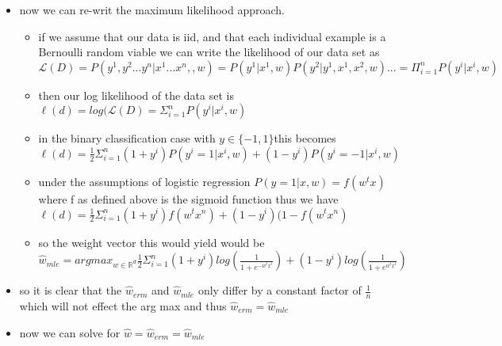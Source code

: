 \documentclass{article}
\theoremstyle{plain}
\theoremstyle{definition}
\begin{document}
\begin{enumerate}
\begin{itemize}
\begin{itemize}
    \item notice further that if we define the sigmoid function as $f(x)=\frac{1}{1+e^{-x}}$
    we can express our problem as $\hat{w}_{erm}= argmax_{w\in \mathbb{R}^{d}}\frac{1}{2n}\Sigma_{i=1}^{n}(1+y^i)log(\frac{1}{1+e^{-w^tx^i}})+(1-y^i)log(\frac{1}{1+e^{w^tx^i}}) = argmax_{w\in \mathbb{R}^{d}}\frac{1}{2n}\Sigma_{i=1}^{n}(1+y^i)f(w^tx^i)+(1-y^i)f(-w^tx^i)$
    \item further note the following equality $1-f(x)=1-\frac{1}{1+e^{-x}}=\frac{e^{-x}}{1+e^{-x}}=\frac{1}{1+e^x}=f(-x)$
    \item so substituting this back into our erm function yields our final result for erm $$\hat{w}_{erm}=argmax_{w\in \mathbb{R}^{d}}\frac{1}{2n}\Sigma_{i=1}^{n}(1+y^i)log(f(x))+(1-y^i)log(1-f(x))$$
\end{itemize}
\item now we can re-writ the maximum likelihood approach. 
\begin{itemize}
    \item if we assume that our data is iid, and that each individual example is a Bernoulli random viable we can write the likelihood of our data set as $\mathcal{L}(D)=P(y^1,y^2...y^n|x^1...x^n,,w)=P(y^1|x^1,w)P(y^2|y^1,x^1,x^2,w)...=\Pi_{i=1}^{n}P(y^i|x^i, w)$ 
    \item then our log likelihood of the data set is $\ell(d)=log(\mathcal{L}(D)=\Sigma_{i=1}^{n}P(y^i|x^i,w)$
    \item in the binary classification case with $y\in\{-1,1\}$this becomes $\ell(d)=\frac{1}{2}\Sigma_{i=1}^{n}(1+y^i)P(y^i=1|x^i,w)+(1-y^i)P(y^i=-1|x^i,w)$
    \item under the assumptions of logistic regression $P(y=1|x,w)=f(w^tx)$ where f as defined above is the sigmoid function thus we have $\ell(d)=\frac{1}{2}\Sigma_{i=1}^{n}(1+y^i)f(w^tx^n)+(1-y^i)(1-f(w^tx^n)$
    \item so the weight vector this would yield would be    $\hat{w}_{mle}= argmax_{w\in \mathbb{R}^{d}}\frac{1}{2}\Sigma_{i=1}^{n}(1+y^i)log(\frac{1}{1+e^{-w^tx^i}})+(1-y^i)log(\frac{1}{1+e^{w^tx^i}}) $
\end{itemize}
\item so it is clear that the $\hat{w}_{erm}$ and $\hat{w}_{mle}$ only differ by a constant factor of $\frac{1}{n}$ which will not effect the arg max and thus $\hat{w}_{erm}=\hat{w}_{mle}$
\item now we can solve for $\hat{w}=\hat{w}_{erm}=\hat{w}_{mle}$
\begin{itemize}

\end{itemize}
\end{itemize}
\end{enumerate}
\end{document}
